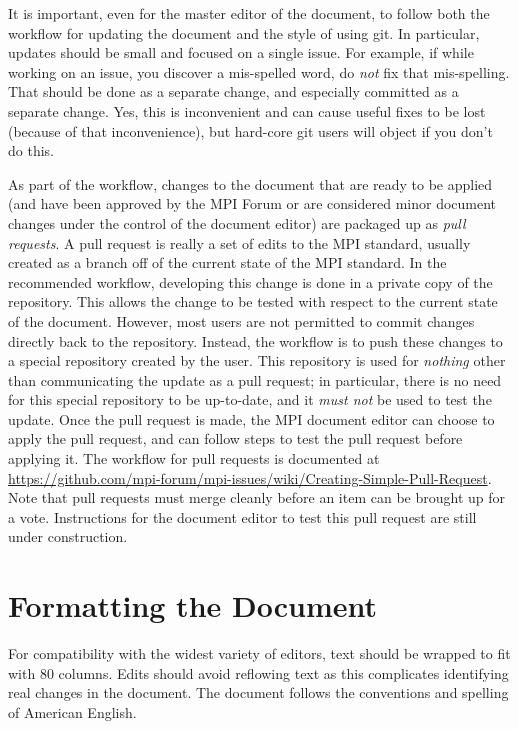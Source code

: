 \documentclass[letterpaper,twoside,11pt,fleqn]{article}
\def\MPI/{\textsf{MPI}}    %
\begin{document}
It is important, even for the master editor of the document, to follow
both the workflow for updating the document and the style of using
git.
In particular, updates should be small and focused on a single issue.
For example, if while working on an issue, you discover a mis-spelled
word, do \emph{not} fix that mis-spelling.  That should be done as a
separate change, and especially committed as a separate change.  Yes, this is
inconvenient and can cause useful fixes to be lost (because of that
inconvenience), but hard-core git users will object if you don't do
this.

As part of the workflow, changes to the document that are ready to be
applied (and have been approved by the \MPI/ Forum or are considered
minor document changes under the control of the document editor) are
packaged up as \emph{pull requests}.
A pull request is really a set of edits to the \MPI/ standard,
usually created as a branch off of the current state of the \MPI/
standard.
In the recommended workflow, developing this change is done in a
private copy of the repository. This allows the change to be tested
with respect to the current state of the document.  However, most
users are not permitted to commit changes directly back to the
repository.  Instead, the workflow is to push these changes to a
special repository created by the user.  This repository is used for
\emph{nothing} other than communicating the update as a pull request;
in particular, there is no need for this special repository to be
up-to-date, and it \emph{must not} be used to test the update.
Once the pull request is made, the \MPI/ document editor can choose to
apply the pull request, and can follow steps to test the pull request
before applying it.
The workflow for pull requests is documented at
\url{https://github.com/mpi-forum/mpi-issues/wiki/Creating-Simple-Pull-Request}.
Note that pull requests must merge cleanly before an item can be
brought up for a vote.
Instructions for the document editor to test this pull request are
still under construction.

\section{Formatting the Document}
\label{sec:formatting}

For compatibility with the widest variety of editors, text should be
wrapped to fit with 80 columns.  Edits should avoid reflowing text as
this complicates identifying real changes in the document.
The document follows the conventions and spelling of American English.
\end{document}
